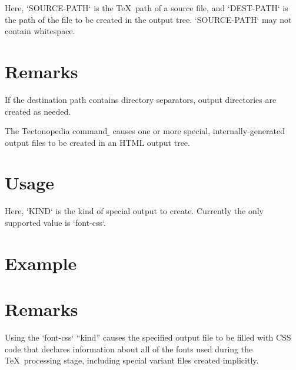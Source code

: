 \begin{texdisp}
\end{texdisp}

Here, \tex`SOURCE-PATH` is the \TeX\ path of a source file, and \tex`DEST-PATH`
is the path of the file to be created in the output tree. \tex`SOURCE-PATH` may
not contain whitespace.

\section*{Remarks}

If the destination path contains directory separators, output directories are
created as needed.

\tduxEmit



The Tectonopedia command \b{\string\tduxProvideSpecial} causes one or more
special, internally-generated output files to be created in an HTML output tree.

\section*{Usage}

\begin{texdisp}
\end{texdisp}

Here, \tex`KIND` is the kind of special output to create. Currently the only
supported value is \tex`font-css`.

\section*{Example}

\begin{texdisp}
\end{texdisp}

\section*{Remarks}

Using the \tex`font-css` “kind” causes the specified output file to be filled
with CSS code that declares information about all of the fonts used during the
\TeX\ processing stage, including special variant files created implicitly.
